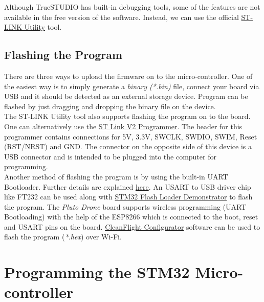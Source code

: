 \documentclass[a4paper,12pt,oneside]{book}
\begin{document}
Although TrueSTUDIO has built-in debugging tools, some of the features are not available in the free version of the software. Instead, we can use the official \href{http://www.st.com/en/embedded-software/stsw-link004.html}{ST-LINK Utility} tool.\\

\subsection{Flashing the Program}
There are three ways to upload the firmware on to the micro-controller. One of the easiest way is to simply generate a \textit{binary (*.bin)} file, connect your board via USB and it should be detected as an external storage device. Program can be flashed by just dragging and dropping the binary file on the device.\\

The ST-LINK Utility tool also supports flashing the program on to the board. One can alternatively use the \href{http://www.amazon.in/xcluma-St-Link-Stlink-Emulator-Downloader/dp/B072TFSGW7/ref=sr_1_1?ie=UTF8&qid=1499104526&sr=8-1&keywords=st+link}{ST Link V2 Programmer}. The header for this programmer contains connections for 5V, 3.3V, SWCLK, SWDIO, SWIM, Reset (RST/NRST) and GND. The connector on the opposite side of this device is a USB connector and is intended to be plugged into the computer for programming.\\

Another method of flashing the program is by using the built-in UART Bootloader. Further details are explained \href{http://www.scienceprog.com/flashing-programs-to-stm32-embedded-bootloader/}{here}. An USART to USB driver chip like FT232 can be used along with \href{http://www.st.com/en/development-tools/flasher-stm32.html}{STM32 Flash Loader Demonstrator} to flash the program. The \textit{Pluto Drone} board supports wireless programming (UART Bootloading) with the help of the ESP8266 which is connected to the boot, reset and USART pins on the board. \href{https://chrome.google.com/webstore/detail/cleanflight-configurator/enacoimjcgeinfnnnpajinjgmkahmfgb?hl=en}{CleanFlight Configurator} software can be used to flash the program (\textit{*.hex}) over Wi-Fi. 

\section{Programming the STM32 Micro-controller}
\label{sec:progstm32}
\end{document}
